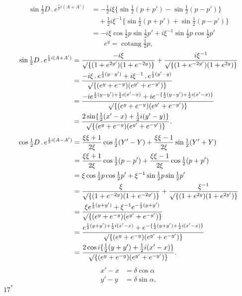 \[
\begin{aligned}
\sin\tfrac12D\,.\,e^{\frac12i(A+A')}
 &=-\tfrac12i\xi\{\sin\tfrac12(p+p')-\sin\tfrac12(p-p')\}\\
 &\quad+\tfrac12i\xi^{-1}\{\sin\tfrac12(p+p')+\sin\tfrac12(p-p')\}\\
 &=-i\xi\cos\tfrac12p\sin\tfrac12p'+i\xi^{-1}\sin\tfrac12p\cos\tfrac12p'
\end{aligned}
\]
\[
e^y=\operatorname{cotang}\tfrac12p,
\]
\[
\begin{aligned}
\sin\tfrac12D\,.\,e^{\frac12i(A+A')}
 &=\frac{-i\xi}{\surd\{(1+e^{2y'})(1+e^{-2y})\}}
 +\frac{i\xi^{-1}}{\surd\{(1+e^{-2y'})(1+e^{2y})\}}\\
 &=\frac{-i\xi\,.\,e^{\frac12(y-y')}+i\xi^{-1}\,.\,e^{\frac12(y'-y)}}
 {\surd\{(e^y+e^{-y})(e^{y'}+e^{-y'})\}}\\
 &=\frac{-ie^{\frac12(y-y')+\frac12i(x'-x)}
 +ie^{-\{\frac12(y-y')+\frac12i(x'-x)\}}}{\surd\{(e^y+e^{-y})(e^{y'}+e^{-y'})\}}\\
 &=\frac{2\sin\{\tfrac12(x'-x)+\tfrac12i(y'-y)\}}
 {\surd\{(e^y+e^{-y})(e^{y'}+e^{-y'})\}}.
\end{aligned}
\]
\[
\begin{aligned}
\cos\tfrac12D\,.\,e^{\frac12i(A-A')}
 &=\frac{\xi\xi+1}{2\xi}\cos\tfrac12(Y'-Y)
 +\frac{\xi\xi-1}{2\xi}\sin\tfrac12(Y'+Y)\\
 &=\frac{\xi\xi+1}{2\xi}\cos\tfrac12(p-p')
 +\frac{\xi\xi-1}{2\xi}\cos\tfrac12(p+p')\\
 &=\xi\cos\tfrac12p\cos\tfrac12p'
 +\xi^{-1}\sin\tfrac12p\sin\tfrac12p'\\
 &=\frac{\xi}{\surd\{(1+e^{-2y})(1+e^{-2y'})\}}
 +\frac{\xi^{-1}}{\surd\{(1+e^{2y})(1+e^{2y'})\}}\\
 &=\frac{\xi e^{\frac12(y+y')}+\xi^{-1}e^{-\frac12(y+y')}}
 {\surd\{(e^y+e^{-y})(e^{y'}+e^{-y'})\}}\\
 &=\frac{e^{\frac12(y+y')+\frac12i(x'-x)}
 +e^{-\{\frac12(y+y')+\frac12i(x'-x)\}}}{\surd\{(e^y+e^{-y})(e^{y'}+e^{-y'})\}}\\
 &=\frac{2\cos i\{\tfrac12(y+y')+\tfrac12i(x'-x)\}}
 {\surd\{(e^y+e^{-y})(e^{y'}+e^{-y'})\}}.
\end{aligned}
\]
\[
\begin{aligned}
x'-x&=\delta\cos\alpha\\
y'-y&=\delta\sin\alpha,
\end{aligned}
\]
\noindent\hfill \(17^{*}\)\hspace*{.13\linewidth}\par
\endgroup
